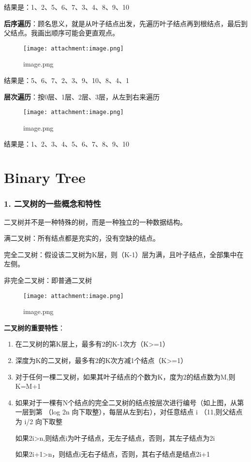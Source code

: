 \documentclass[11pt]{article}
\makeatletter
\def\maxwidth{\ifdim\Gin@nat@width>\linewidth\linewidth
    \else\Gin@nat@width\fi}
\let\Oldincludegraphics\includegraphics
\renewcommand{\includegraphics}[1]{\Oldincludegraphics[width=.8\maxwidth]{#1}}
\makeatother
\begin{document}
结果是：1、2、5、6、7、3、4、8、9、10

    \textbf{后序遍历}：顾名思义，就是从叶子结点出发，先遍历叶子结点再到根结点，最后到父结点。我画出顺序可能会更直观点。

\begin{figure}
\centering
\texttt{[image: attachment:image.png]}
\caption{image.png}
\end{figure}

结果是：5、6、7、2、3、9、10、8、4、1

    \textbf{层次遍历}：按0层、1层、2层、3层，从左到右来遍历

\begin{figure}
\centering
\texttt{[image: attachment:image.png]}
\caption{image.png}
\end{figure}

结果是：1、2、3、4、5、6、7、8、9、10

    \section{Binary Tree}\label{binary-tree}

    \subsubsection{1.
二叉树的一些概念和特性}\label{ux4e8cux53c9ux6811ux7684ux4e00ux4e9bux6982ux5ff5ux548cux7279ux6027}

    二叉树并不是一种特殊的树，而是一种独立的一种数据结构。

满二叉树：所有结点都是充实的，没有空缺的结点。

完全二叉树：假设该二叉树为K层，则（K-1）层为满，且叶子结点，全部集中在左侧。

非完全二叉树：即普通二叉树

\begin{figure}
\centering
\texttt{[image: attachment:image.png]}
\caption{image.png}
\end{figure}

    \textbf{二叉树的重要特性}：

\begin{enumerate}
\def\labelenumi{\arabic{enumi}.}
\item
  在二叉树的第K层上，最多有2的K-1次方（K\textgreater{}=1）
\item
  深度为K的二叉树，最多有2的K次方减1个结点（K\textgreater{}=1）
\item
  对于任何一棵二叉树，如果其叶子结点的个数为K，度为2的结点数为M,则K=M+1
\item
  如果对于一棵有N个结点的完全二叉树的结点按层次进行编号（如上图，从第一层到第
  （log 2n 向下取整），每层从左到右），对任意结点 i （11,则父结点为 i/2
  向下取整

  如果2i\textgreater{}n,则结点i为叶子结点，无左子结点，否则，其左子结点为2i

  如果2i+1\textgreater{}n，则结点i无右子结点，否则，其右子结点是结点2i+1
\end{enumerate}
\end{document}

